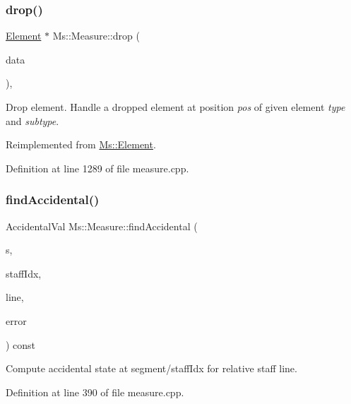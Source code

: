 \subsubsection{\texorpdfstring{drop()}{drop()}}
{\footnotesize\ttfamily \hyperlink{class_ms_1_1_element}{Element} $\ast$ Ms\+::\+Measure\+::drop (\begin{DoxyParamCaption}\item[{\hyperlink{class_ms_1_1_edit_data}{Edit\+Data} \&}]{data }\end{DoxyParamCaption})\hspace{0.3cm}{\ttfamily [override]}, {\ttfamily [virtual]}}

Drop element. Handle a dropped element at position {\itshape pos} of given element {\itshape type} and {\itshape subtype}. 

Reimplemented from \hyperlink{class_ms_1_1_element_a0ca69a9fb48e7b9fb481aacaf3860032}{Ms\+::\+Element}.



Definition at line 1289 of file measure.\+cpp.

\mbox{\label{class_ms_1_1_measure_a15f7fbbb7f21f0c936bb2e55c502c499}} 
\subsubsection{\texorpdfstring{find\+Accidental()}{findAccidental()}}
{\footnotesize\ttfamily Accidental\+Val Ms\+::\+Measure\+::find\+Accidental (\begin{DoxyParamCaption}\item[{\hyperlink{class_ms_1_1_segment}{Segment} $\ast$}]{s,  }\item[{int}]{staff\+Idx,  }\item[{int}]{line,  }\item[{bool \&}]{error }\end{DoxyParamCaption}) const}

Compute accidental state at segment/staff\+Idx for relative staff line. 

Definition at line 390 of file measure.\+cpp.

\mbox{\label{class_ms_1_1_measure_a4fe8e5a83c238d686df4930a59ad6861}} 
